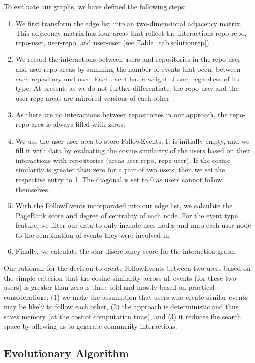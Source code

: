 \documentclass[dvipsnames,format=sigconf,anonymous=False,review=false, balance=false]{acmart}
\begin{document}
To evaluate our graphs, we have defined the following steps:
\begin{enumerate}
\item We first transform the edge list into an two-dimensional adjacency matrix. This adjacency matrix has four areas that reflect the interactions repo-repo, repo-user, user-repo, and user-user (see Table~\ref{tab:solutionrep}). 
\item We record the interactions between users and repositories in the repo-user and user-repo areas by summing the number of events that occur between each repository and user. Each event has a weight of one, regardless of its type. 
At present, as we do not further differentiate, the repo-user and the user-repo areas are mirrored versions of each other. 
\item As there are no interactions between repositories in our approach, the repo-repo area is always filled with zeros.
\item We use the user-user area to store FollowEvents. It is initially empty, and we fill it with data by evaluating the cosine similarity of the users based on their interactions with repositories (areas user-repo, repo-user). 
If the cosine similarity is greater than zero for a pair of two users, then we set the respective entry to 1. 
The diagonal is set to 0 as users cannot follow themselves. 
\item With the FollowEvents incorporated into our edge list, we calculate the PageRank score and degree of centrality of each node. For the event type feature, we filter our data to only include user nodes and map each user node to the combination of events they were involved in.
\item Finally, we calculate the star-discrepancy score for the interaction graph. 
\end{enumerate}

Our rationale for the decision to create FollowEvents between two users based on the simple criterion that the cosine similarity across all events (for these two users) is greater than zero is three-fold and mostly based on practical considerations: (1) we make the assumption that users who create similar events may be likely to follow each other, (2) the approach is deterministic and thus saves memory (at the cost of computation time), and (3) it reduces the search space by allowing us to generate community interactions. 

\subsection{Evolutionary Algorithm}
\end{document}
